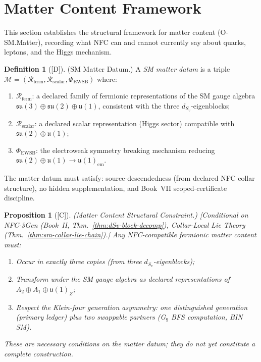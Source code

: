 \documentclass[12pt,oneside]{amsbook}
\theoremstyle{plain}
\newtheorem{proposition}[theorem]{Proposition}
\theoremstyle{definition}
\newtheorem{definition}[theorem]{Definition}
\theoremstyle{remark}
\newcommand{\status}[1]{\textup{[#1]}}
\begin{document}
\section{Matter Content Framework}
\label{sec:sm-matter}

This section establishes the structural framework for matter content
(O-SM.Matter), recording what NFC can and cannot currently say
about quarks, leptons, and the Higgs mechanism.

\begin{definition}[\status{D}]\label{def:SM-matter-datum}
\textup{(SM Matter Datum.)}
A \emph{SM matter datum} is a triple
$\mathcal{M} = (\mathcal{R}_{\mathrm{ferm}},
\mathcal{R}_{\mathrm{scalar}}, \Phi_{\mathrm{EWSB}})$ where:
\begin{enumerate}[label=\textup{(\arabic*)}]
 \item $\mathcal{R}_{\mathrm{ferm}}$: a declared family of
 fermionic representations of the SM gauge algebra
 $\mathfrak{su}(3)\oplus\mathfrak{su}(2)\oplus\mathfrak{u}(1)$,
 consistent with the three $d_{S_v}$-eigenblocks;
 \item $\mathcal{R}_{\mathrm{scalar}}$: a declared scalar
 representation (Higgs sector) compatible with
 $\mathfrak{su}(2)\oplus\mathfrak{u}(1)$;
 \item $\Phi_{\mathrm{EWSB}}$: the electroweak symmetry breaking
 mechanism reducing
 $\mathfrak{su}(2)\oplus\mathfrak{u}(1) \to
 \mathfrak{u}(1)_{\mathrm{em}}$.
\end{enumerate}
The matter datum must satisfy: source-descendedness (from declared
NFC collar structure), no hidden supplementation, and Book~VII
scoped-certificate discipline.
\end{definition}

\begin{proposition}[\status{C}]\label{prop:SM-matter-constraint}
\textup{(Matter Content Structural Constraint.)}
\textup{[Conditional on NFC-3Gen (Book~II, Thm.~\ref{thm:dSv-block-decomp}),
Collar-Local Lie Theory (Thm.~\ref{thm:sm-collar-lie-chain}).]}
Any NFC-compatible fermionic matter content must:
\begin{enumerate}[label=\textup{(\arabic*)}]
 \item Occur in exactly three copies (from three $d_{S_v}$-eigenblocks);
 \item Transform under the SM gauge algebra as declared representations
 of $A_2 \oplus A_1 \oplus \mathfrak{u}(1)_Z$;
 \item Respect the Klein-four generation asymmetry: one distinguished
 generation (primary ledger) plus two swappable partners (G$_9$
 BFS computation, BIN SM).
\end{enumerate}
These are necessary conditions on the matter datum; they do not
yet constitute a complete construction.
\end{proposition}
\end{document}
